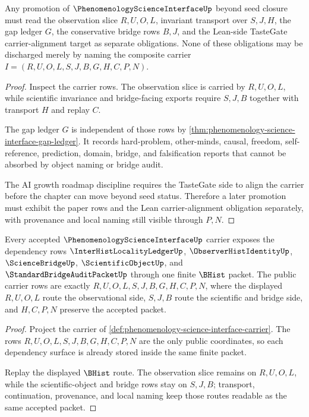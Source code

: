 \begin{theorem}
\label{thm:phenomenology-science-interface-tastegate-grounding}
Any promotion of $\PhenomenologyScienceInterfaceUp$ beyond seed closure must read the observation slice $R,U,O,L$, invariant transport over $S,J,H$, the gap ledger $G$, the conservative bridge rows $B,J$, and the Lean-side TasteGate carrier-alignment target as separate obligations. None of these obligations may be discharged merely by naming the composite carrier $I=(R,U,O,L,S,J,B,G,H,C,P,N)$.
\end{theorem}
\begin{proof}
Inspect the carrier rows. The observation slice is carried by $R,U,O,L$, while scientific invariance and bridge-facing exports require $S,J,B$ together with transport $H$ and replay $C$.

The gap ledger $G$ is independent of those rows by \autoref{thm:phenomenology-science-interface-gap-ledger}. It records hard-problem, other-minds, causal, freedom, self-reference, prediction, domain, bridge, and falsification reports that cannot be absorbed by object naming or bridge audit.

The AI growth roadmap discipline requires the TasteGate side to align the carrier before the chapter can move beyond seed status. Therefore a later promotion must exhibit the paper rows and the Lean carrier-alignment obligation separately, with provenance and local naming still visible through $P,N$.
\end{proof}

\begin{theorem}
\label{thm:phenomenology-science-interface-obligation-carrier}
Every accepted $\PhenomenologyScienceInterfaceUp$ carrier exposes the dependency rows $\InterHistLocalityLedgerUp$, $\ObserverHistIdentityUp$, $\ScienceBridgeUp$, $\ScientificObjectUp$, and $\StandardBridgeAuditPacketUp$ through one finite $\BHist$ packet. The public carrier rows are exactly $R,U,O,L,S,J,B,G,H,C,P,N$, where the displayed $R,U,O,L$ route the observational side, $S,J,B$ route the scientific and bridge side, and $H,C,P,N$ preserve the accepted packet.
\end{theorem}
\begin{proof}
Project the carrier of \autoref{def:phenomenology-science-interface-carrier}. The rows $R,U,O,L,S,J,B,G,H,C,P,N$ are the only public coordinates, so each dependency surface is already stored inside the same finite packet.

Replay the displayed $\BHist$ route. The observation slice remains on $R,U,O,L$, while the scientific-object and bridge rows stay on $S,J,B$; transport, continuation, provenance, and local naming keep those routes readable as the same accepted packet.
\end{proof}

